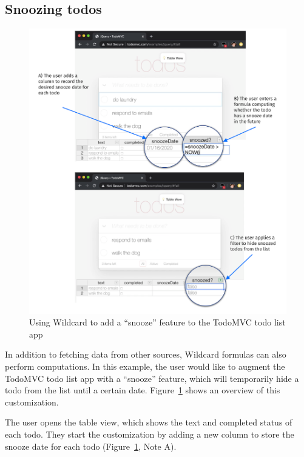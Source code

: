 \documentclass[english]{programming}
\begin{document}
\hypertarget{snoozing-todos}{%
\subsection{Snoozing todos}\label{snoozing-todos}}

\begin{figure}
\hypertarget{fig:todomvc-demo}{%
\centering
\includegraphics{media/todomvc-demo-300dpi.png}
\caption{Using Wildcard to add a ``snooze'' feature to the TodoMVC todo
list app}\label{fig:todomvc-demo}
}
\end{figure}

In addition to fetching data from other sources, Wildcard formulas can
also perform computations. In this example, the user would like to
augment the TodoMVC todo list app with a ``snooze'' feature, which will
temporarily hide a todo from the list until a certain date.{
Figure~\ref{fig:todomvc-demo} shows an overview of this customization.}

The user opens the table view, which shows the text and completed status
of each todo. They start the customization by adding a new column to
store the snooze date for each todo{ (Figure~\ref{fig:todomvc-demo},
Note A)}.
\end{document}
